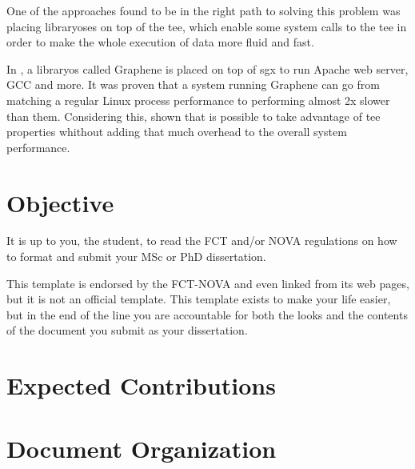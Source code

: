 One of the approaches found to be in the right path to solving this problem was placing library\gls{os}es on top of the \gls{tee}, which enable some system calls to the \gls{tee} in order to make the whole execution of data more fluid and fast. 

In \cite{graphenePaper}, a library\gls{os} called Graphene is placed on top of \gls{sgx} to run Apache web server, GCC and more. It was proven that a system running Graphene can go from matching a regular Linux process performance to performing almost 2x slower than them. Considering this, \cite{graphenePaper} shown that is possible to take advantage of \gls{tee} properties whithout adding that much overhead to the overall system performance.




\section{Objective} %
\label{sec:disclaimer}

It is up to you, the student, to read the FCT and/or NOVA regulations on how to format and submit your MSc or PhD dissertation.  

This template is endorsed by the FCT-NOVA and even linked from its web pages, but it is not an official template.
%
This template exists to make your life easier, but in the end of the line you are accountable for both the looks and the contents of the document you submit as your dissertation.

\section{Expected Contributions}

\section{Document Organization}
